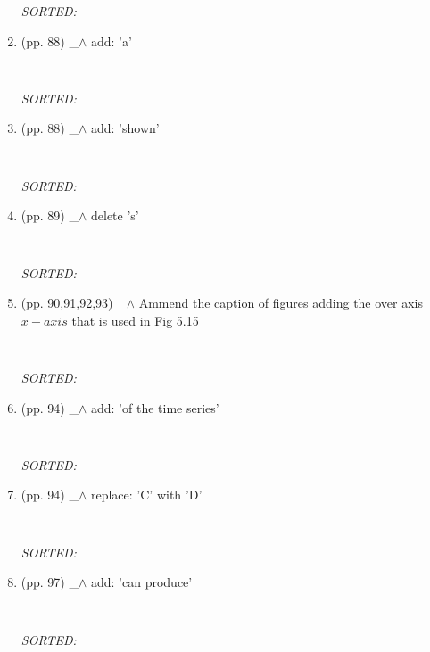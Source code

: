 \documentclass[12pt]{article}
\begin{document}
\begin{enumerate}
\begin{verbatim}
	\end{verbatim}
	\textit{
	SORTED:  
	}
	\\

\item  (pp. 88)  \_$\wedge$  
	add: 'a'
	\begin{verbatim}
	
	\end{verbatim}
	\textit{
	SORTED:  
	}
	\\

\item  (pp. 88)  \_$\wedge$  
	add: 'shown'
	\begin{verbatim}
	
	\end{verbatim}
	\textit{
	SORTED:  
	}
	\\

\item  (pp. 89)  \_$\wedge$  
	delete 's'
	\begin{verbatim}
	
	\end{verbatim}
	\textit{
	SORTED:  
	}
	\\

\item  (pp. 90,91,92,93)  \_$\wedge$  
	Ammend the caption of figures 
	adding the over axis $x-axis$	
	that is used in Fig 5.15
	\begin{verbatim}
	
	\end{verbatim}
	\textit{
	SORTED:  
	}
	\\


\item  (pp. 94)  \_$\wedge$  
	add: 'of the time series'
	\begin{verbatim}
	
	\end{verbatim}
	\textit{
	SORTED:  
	}
	\\

\item  (pp. 94)  \_$\wedge$  
	replace: 'C' with 'D'
	\begin{verbatim}
	
	\end{verbatim}
	\textit{
	SORTED:  
	}
	\\

\item  (pp. 97)  \_$\wedge$  
	add: 'can produce'
	\begin{verbatim}
	
	\end{verbatim}
	\textit{
	SORTED:  
	}
	\\


\end{enumerate}
\end{document}
